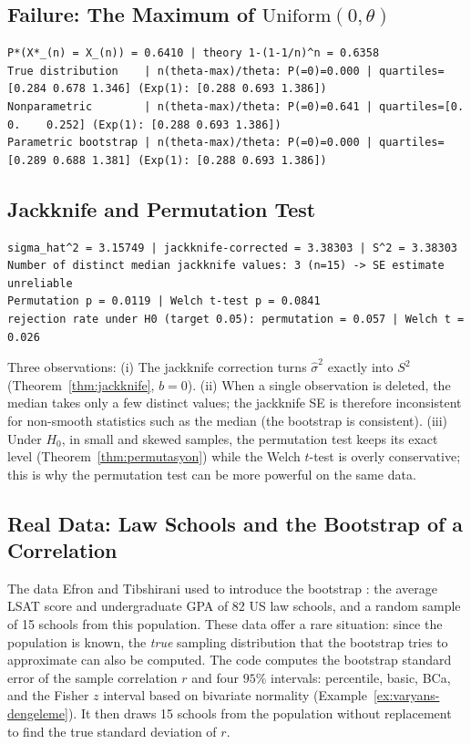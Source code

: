 \documentclass[main.tex]{subfiles}
\begin{document}
\subsection{Failure: The Maximum of $\text{Uniform}(0,\theta)$}

\begin{lstlisting}[style=output]
P*(X*_(n) = X_(n)) = 0.6410 | theory 1-(1-1/n)^n = 0.6358
True distribution    | n(theta-max)/theta: P(=0)=0.000 | quartiles=[0.284 0.678 1.346] (Exp(1): [0.288 0.693 1.386])
Nonparametric        | n(theta-max)/theta: P(=0)=0.641 | quartiles=[0.    0.    0.252] (Exp(1): [0.288 0.693 1.386])
Parametric bootstrap | n(theta-max)/theta: P(=0)=0.000 | quartiles=[0.289 0.688 1.381] (Exp(1): [0.288 0.693 1.386])
\end{lstlisting}

\subsection{Jackknife and Permutation Test}

\begin{lstlisting}[style=output]
sigma_hat^2 = 3.15749 | jackknife-corrected = 3.38303 | S^2 = 3.38303
Number of distinct median jackknife values: 3 (n=15) -> SE estimate unreliable
Permutation p = 0.0119 | Welch t-test p = 0.0841
rejection rate under H0 (target 0.05): permutation = 0.057 | Welch t = 0.026
\end{lstlisting}

Three observations: (i) The jackknife correction turns $\hat\sigma^2$ exactly into $S^2$ (Theorem~\ref{thm:jackknife}, $b=0$). (ii) When a single observation is deleted, the median takes only a few distinct values; the jackknife SE is therefore inconsistent for non-smooth statistics such as the median (the bootstrap is consistent). (iii) Under $H_0$, in small and skewed samples, the permutation test keeps its exact level (Theorem~\ref{thm:permutasyon}) while the Welch $t$-test is overly conservative; this is why the permutation test can be more powerful on the same data.

\subsection{Real Data: Law Schools and the Bootstrap of a Correlation}\label{sec:hukuk}
The data Efron and Tibshirani used to introduce the bootstrap \cite{efron-tib}: the average LSAT score and undergraduate GPA of 82 US law schools, and a random sample of 15 schools from this population. These data offer a rare situation: since the population is known, the \emph{true} sampling distribution that the bootstrap tries to approximate can also be computed. The code computes the bootstrap standard error of the sample correlation $r$ and four $95\%$ intervals: percentile, basic, BCa, and the Fisher $z$ interval based on bivariate normality (Example~\ref{ex:varyans-dengeleme}). It then draws 15 schools from the population without replacement to find the true standard deviation of $r$.
\end{document}
